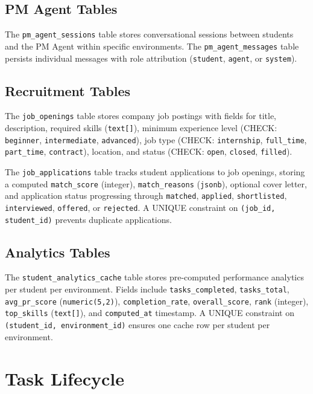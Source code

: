 \documentclass[12pt,a4paper]{report}
\begin{document}
\subsection{PM Agent Tables}

The \texttt{pm\_agent\_sessions} table stores conversational sessions between students and the PM Agent within specific environments. The \texttt{pm\_agent\_messages} table persists individual messages with role attribution (\texttt{student}, \texttt{agent}, or \texttt{system}).

\subsection{Recruitment Tables}

The \texttt{job\_openings} table stores company job postings with fields for title, description, required skills (\texttt{text[]}), minimum experience level (CHECK: \texttt{beginner}, \texttt{intermediate}, \texttt{advanced}), job type (CHECK: \texttt{internship}, \texttt{full\_time}, \texttt{part\_time}, \texttt{contract}), location, and status (CHECK: \texttt{open}, \texttt{closed}, \texttt{filled}).

The \texttt{job\_applications} table tracks student applications to job openings, storing a computed \texttt{match\_score} (integer), \texttt{match\_reasons} (\texttt{jsonb}), optional cover letter, and application status progressing through \texttt{matched}, \texttt{applied}, \texttt{shortlisted}, \texttt{interviewed}, \texttt{offered}, or \texttt{rejected}. A UNIQUE constraint on \texttt{(job\_id, student\_id)} prevents duplicate applications.

\subsection{Analytics Tables}

The \texttt{student\_analytics\_cache} table stores pre-computed performance analytics per student per environment. Fields include \texttt{tasks\_completed}, \texttt{tasks\_total}, \texttt{avg\_pr\_score} (\texttt{numeric(5,2)}), \texttt{completion\_rate}, \texttt{overall\_score}, \texttt{rank} (integer), \texttt{top\_skills} (\texttt{text[]}), and \texttt{computed\_at} timestamp. A UNIQUE constraint on \texttt{(student\_id, environment\_id)} ensures one cache row per student per environment.

\section{Task Lifecycle}
\end{document}
